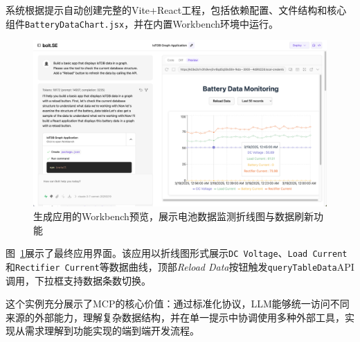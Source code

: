系统根据提示自动创建完整的Vite+React工程，包括依赖配置、文件结构和核心组件\texttt{BatteryDataChart.jsx}，并在内置Workbench环境中运行。

\begin{figure}[H]
  \centering
  \includegraphics[width=\textwidth,height=0.75\textheight,keepaspectratio]{figures/screenshots/iotdb-demo/app-preview.png}
  \caption{生成应用的Workbench预览，展示电池数据监测折线图与数据刷新功能}
  \label{fig:app-preview}
\end{figure}

图~\ref{fig:app-preview}展示了最终应用界面。该应用以折线图形式展示\texttt{DC Voltage}、\texttt{Load Current}和\texttt{Rectifier Current}等数据曲线，顶部\textit{Reload Data}按钮触发\texttt{queryTableData}API调用，下拉框支持数据条数切换。

这个实例充分展示了MCP的核心价值：通过标准化协议，LLM能够统一访问不同来源的外部能力，理解复杂数据结构，并在单一提示中协调使用多种外部工具，实现从需求理解到功能实现的端到端开发流程。
